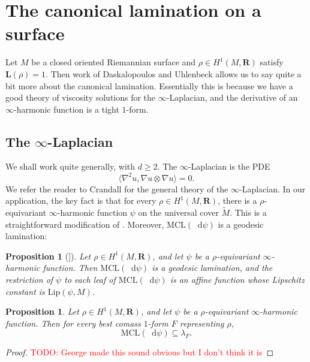 \documentclass[reqno,11pt]{amsart}
\newcommand{\RR}{\mathbf{R}}
\newcommand*\dif{\mathop{}\!\mathrm{d}}
\newcommand{\Lip}{\mathrm{Lip}}
\newcommand{\MCL}{\mathrm{MCL}}
\newcommand{\Comass}{\mathbf L}
\newtheorem{proposition}[theorem]{Proposition}
\theoremstyle{definition}
\numberwithin{equation}{section}
\newcommand\todo[1]{\textcolor{red}{TODO: #1}}
\begin{document}
\section{The canonical lamination on a surface}
Let $M$ be a closed oriented Riemannian surface and $\rho \in H^1(M, \RR)$ satisfy $\Comass(\rho) = 1$.
Then work of Daskalopoulos and Uhlenbeck \cite{daskalopoulos2020transverse} allows us to say quite a bit more about the canonical lamination.
Essentially this is because we have a good theory of viscosity solutions for the $\infty$-Laplacian, and the derivative of an $\infty$-harmonic function is a tight $1$-form.

\subsection{The \texorpdfstring{$\infty$-Laplacian}{infinity-Laplacian}}
We shall work quite generally, with $d \geq 2$.
The $\infty$-Laplacian is the PDE 
$$\langle \nabla^2 u, \nabla u \otimes \nabla u\rangle = 0.$$
We refer the reader to Crandall \cite{Crandall2008} for the general theory of the $\infty$-Laplacian.
In our application, the key fact is that for every $\rho \in H^1(M, \RR)$, there is a $\rho$-equivariant $\infty$-harmonic function $\psi$ on the universal cover $\tilde M$. This is a straightforward modification of \cite[Theorem 2.4]{daskalopoulos2020transverse}.
Moreover, $\MCL(\dif \psi)$ is a geodesic lamination:

\begin{proposition}[{\cite[[Theorem 5.2]{daskalopoulos2020transverse}]}]
Let $\rho \in H^1(M, \RR)$, and let $\psi$ be a $\rho$-equivariant $\infty$-harmonic function.
Then $\MCL(\dif \psi)$ is a geodesic lamination, and the restriction of $\psi$ to each leaf of $\MCL(\dif \psi)$ is an affine function whose Lipschitz constant is $\Lip(\psi, M)$.
\end{proposition}

\begin{proposition}\label{infinity laplacian is canonical lamination}
Let $\rho \in H^1(M, \RR)$, and let $\psi$ be a $\rho$-equivariant $\infty$-harmonic function.
Then for every best comass $1$-form $F$ representing $\rho$,
$$\MCL(\dif \psi) \subseteq \lambda_F.$$
\end{proposition}
\begin{proof}
\todo{George made this sound obvious but I don't think it is}
\end{proof}
\end{document}
